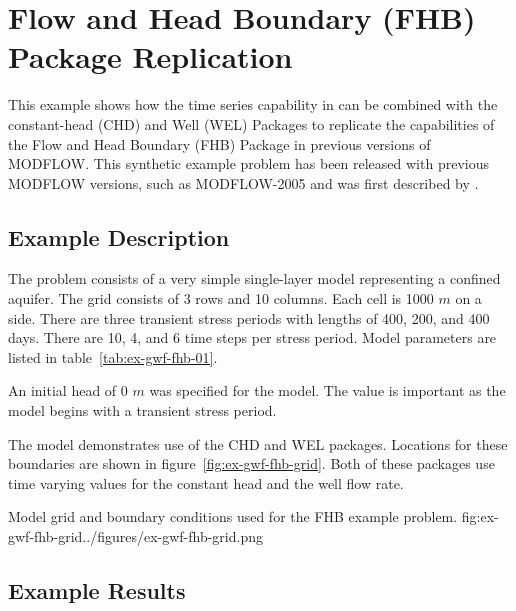 \section{Flow and Head Boundary (FHB) Package Replication}

This example shows how the time series capability in \mf can be combined with the constant-head (CHD) and Well (WEL) Packages to replicate the capabilities of the Flow and Head Boundary (FHB) Package in previous versions of MODFLOW.  This synthetic example problem has been released with previous MODFLOW versions, such as MODFLOW-2005 \citep{modflow2005} and was first described by \cite{leake1997documentation}.

\subsection{Example Description}

The problem consists of a very simple single-layer model representing a confined aquifer.  The grid consists of 3 rows and 10 columns.  Each cell is 1000 $m$ on a side.  There are three transient stress periods with lengths of 400, 200, and 400 days.   There are 10, 4, and 6 time steps per stress period.  Model parameters are listed in table~\ref{tab:ex-gwf-fhb-01}. 



An initial head of 0 $m$ was specified for the model.  The value is important as the model begins with a transient stress period.

The model demonstrates use of the CHD and WEL packages.  Locations for these boundaries are shown in figure~\ref{fig:ex-gwf-fhb-grid}. Both of these packages use time varying values for the constant head and the well flow rate.   

\begin{StandardFigure}{
                                     Model grid and boundary conditions used for the FHB example problem.
                                     }{fig:ex-gwf-fhb-grid}{../figures/ex-gwf-fhb-grid.png}
\end{StandardFigure}                                 

\subsection{Example Results}

